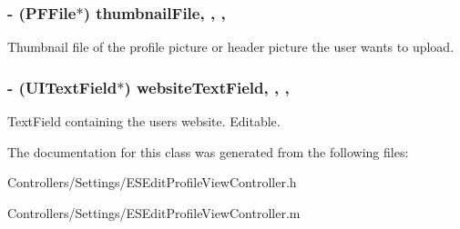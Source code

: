 \subsubsection[{thumbnail\+File}]{\setlength{\rightskip}{0pt plus 5cm}-\/ (P\+F\+File$\ast$) thumbnail\+File\hspace{0.3cm}{\ttfamily [read]}, {\ttfamily [write]}, {\ttfamily [nonatomic]}, {\ttfamily [strong]}}\label{interface_e_s_edit_profile_view_controller_a931a49c00563f36df4c0eef6331cad48}
Thumbnail file of the profile picture or header picture the user wants to upload. \hypertarget{interface_e_s_edit_profile_view_controller_aa97370928b30455a6bea990788b80c75}{}
\subsubsection[{website\+Text\+Field}]{\setlength{\rightskip}{0pt plus 5cm}-\/ (U\+I\+Text\+Field$\ast$) website\+Text\+Field\hspace{0.3cm}{\ttfamily [read]}, {\ttfamily [write]}, {\ttfamily [nonatomic]}, {\ttfamily [strong]}}\label{interface_e_s_edit_profile_view_controller_aa97370928b30455a6bea990788b80c75}
Text\+Field containing the user\textquotesingle{}s website. Editable. 

The documentation for this class was generated from the following files\+:\begin{DoxyCompactItemize}
\item 
Controllers/\+Settings/E\+S\+Edit\+Profile\+View\+Controller.\+h\item 
Controllers/\+Settings/E\+S\+Edit\+Profile\+View\+Controller.\+m\end{DoxyCompactItemize}
